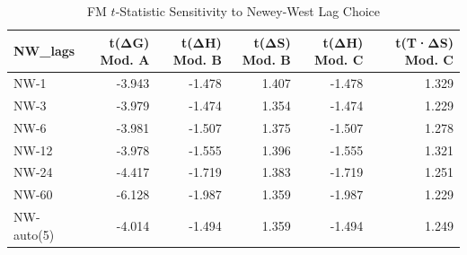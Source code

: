 \begin{table}[ht]
\centering
\small
\caption{FM $t$-Statistic Sensitivity to Newey-West Lag Choice}
\label{tab:nw_sensitivity}
\begin{tabular}{lrrrrr}
\hline\hline
NW_lags & t(ΔG) Mod. A & t(ΔH) Mod. B & t(ΔS) Mod. B & t(ΔH) Mod. C & t(T·ΔS) Mod. C \\
\hline
NW-1 & -3.943 & -1.478 & 1.407 & -1.478 & 1.329 \\
NW-3 & -3.979 & -1.474 & 1.354 & -1.474 & 1.229 \\
NW-6 & -3.981 & -1.507 & 1.375 & -1.507 & 1.278 \\
NW-12 & -3.978 & -1.555 & 1.396 & -1.555 & 1.321 \\
NW-24 & -4.417 & -1.719 & 1.383 & -1.719 & 1.251 \\
NW-60 & -6.128 & -1.987 & 1.359 & -1.987 & 1.229 \\
NW-auto(5) & -4.014 & -1.494 & 1.359 & -1.494 & 1.249 \\
\hline\hline
\end{tabular}
\end{table}